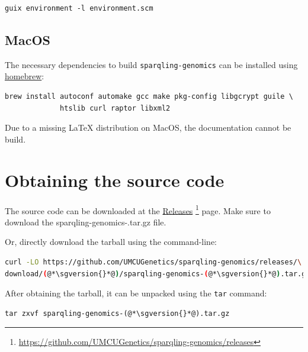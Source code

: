 \begin{siderules}
\begin{verbatim}
guix environment -l environment.scm
\end{verbatim}
\end{siderules}

\subsection{MacOS}

  The necessary dependencies to build \texttt{sparqling-genomics} can be
  installed using \href{https://brew.sh/}{homebrew}:

\begin{siderules}
\begin{verbatim}
brew install autoconf automake gcc make pkg-config libgcrypt guile \
             htslib curl raptor libxml2
\end{verbatim}
\end{siderules}

  Due to a missing \LaTeX{} distribution on MacOS, the documentation
  cannot be build.

\section{Obtaining the source code}
\label{sec:obtaining-tarball}

  \begin{sloppypar}
  The source code can be downloaded at the
  \href{https://github.com/UMCUGenetics/sparqling-genomics/releases}%
  {Releases}%
  \footnote{\url{https://github.com/UMCUGenetics/sparqling-genomics/releases}}
  page.  Make sure to download the {\fontfamily{\ttdefault}\selectfont
    sparqling-genomics-\sgversion{}.tar.gz} file.
  \end{sloppypar}

  Or, directly download the tarball using the command-line:
\begin{siderules}
\begin{lstlisting}[language=bash]
curl -LO https://github.com/UMCUGenetics/sparqling-genomics/releases/\
download/(@*\sgversion{}*@)/sparqling-genomics-(@*\sgversion{}*@).tar.gz
\end{lstlisting}
\end{siderules}

  After obtaining the tarball, it can be unpacked using the \texttt{tar}
  command:

\begin{siderules}
\begin{lstlisting}
tar zxvf sparqling-genomics-(@*\sgversion{}*@).tar.gz
\end{lstlisting}
\end{siderules}


